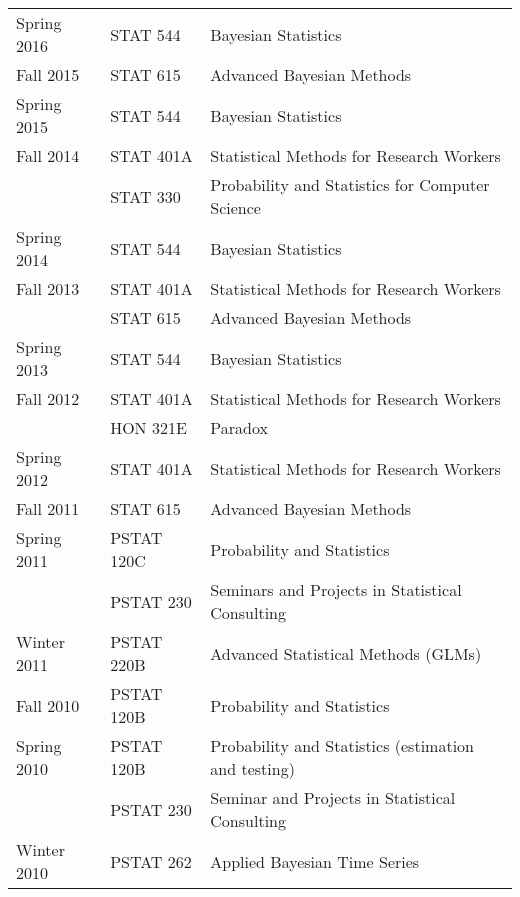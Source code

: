 \documentclass[overlapped,line]{res}
\begin{document}
\begin{resume}
\begin{tabular}{lll}
Spring 2016 & STAT 544 & Bayesian Statistics \\
Fall 2015 & STAT 615 & Advanced Bayesian Methods \\
Spring 2015 & STAT 544 & Bayesian Statistics \\
Fall 2014 & STAT 401A & Statistical Methods for Research Workers \\
& STAT 330 & Probability and Statistics for Computer Science \\
Spring 2014 & STAT 544 & Bayesian Statistics \\
Fall 2013 & STAT 401A & Statistical Methods for Research Workers \\
& STAT 615 & Advanced Bayesian Methods \\
Spring 2013 & STAT 544 & Bayesian Statistics \\
Fall 2012 & STAT 401A & Statistical Methods for Research Workers \\
 & HON 321E & Paradox \\
Spring 2012 & STAT 401A & Statistical Methods for Research Workers \\
Fall 2011 & STAT 615 & Advanced Bayesian Methods \\
\hline
Spring 2011 & PSTAT 120C & Probability and Statistics \\ %
& PSTAT 230 & Seminars and Projects in Statistical Consulting \\
Winter 2011 & PSTAT 220B & Advanced Statistical Methods (GLMs) \\
Fall 2010  & PSTAT 120B & Probability and Statistics \\
Spring 2010 & PSTAT 120B & Probability and Statistics (estimation and testing) \\
 & PSTAT 230 & Seminar and Projects in Statistical Consulting \\
Winter 2010 & PSTAT 262 & Applied Bayesian Time Series
\end{tabular}

%


\end{resume}
\end{document}
